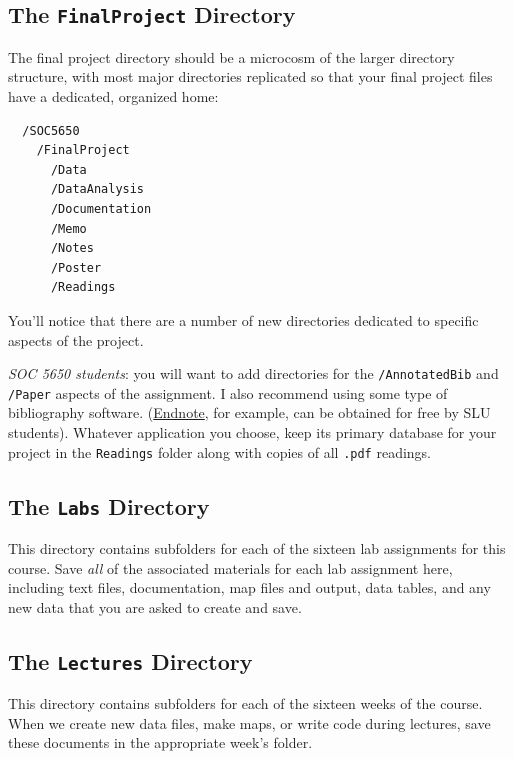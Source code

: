 \documentclass[]{book}
\begin{document}
\subsection{\texorpdfstring{The \texttt{FinalProject}
Directory}{The FinalProject Directory}}\label{the-finalproject-directory}

The final project directory should be a microcosm of the larger
directory structure, with most major directories replicated so that your
final project files have a dedicated, organized home:

\begin{verbatim}
  /SOC5650
    /FinalProject
      /Data
      /DataAnalysis
      /Documentation
      /Memo
      /Notes
      /Poster
      /Readings
\end{verbatim}

You'll notice that there are a number of new directories dedicated to
specific aspects of the project.

\emph{SOC 5650 students}: you will want to add directories for the
\texttt{/AnnotatedBib} and \texttt{/Paper} aspects of the assignment. I
also recommend using some type of bibliography software.
(\href{http://endnote.com}{Endnote}, for example, can be obtained for
free by SLU students). Whatever application you choose, keep its primary
database for your project in the \texttt{Readings} folder along with
copies of all \texttt{.pdf} readings.

\subsection{\texorpdfstring{The \texttt{Labs}
Directory}{The Labs Directory}}\label{the-labs-directory}

This directory contains subfolders for each of the sixteen lab
assignments for this course. Save \emph{all} of the associated materials
for each lab assignment here, including text files, documentation, map
files and output, data tables, and any new data that you are asked to
create and save.

\subsection{\texorpdfstring{The \texttt{Lectures}
Directory}{The Lectures Directory}}\label{the-lectures-directory}

This directory contains subfolders for each of the sixteen weeks of the
course. When we create new data files, make maps, or write code during
lectures, save these documents in the appropriate week's folder.
\end{document}
